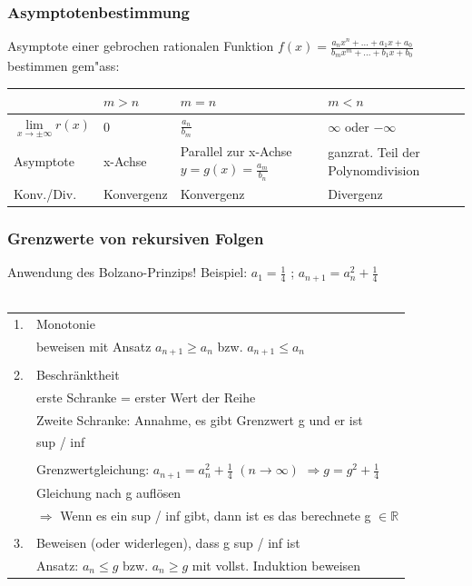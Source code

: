	
		
			\subsubsection{Asymptotenbestimmung}
			Asymptote einer gebrochen rationalen Funktion $f(x) = \frac{a_nx^n + ... + a_1x + a_0}{b_mx^m + ... + b_1x + b_0}$\\
			 bestimmen gem"ass:
			
			\begin{tabular}{|l|l|l|l|}
			\hline
			 & $m > n$ & $m = n$ & $m < n$ \\
			\hline
			 $\lim\limits_{x\to \pm \infty} r(x)$  & 0 & $\frac{a_n}{b_m}$ & $\infty$ oder $-\infty$ \\
			\hline
			 Asymptote & x-Achse & Parallel zur x-Achse $y = g(x) = \frac{a_m}{b_n}$ & ganzrat. Teil der Polynomdivision\\
			\hline
			 Konv./Div. & Konvergenz & Konvergenz & Divergenz \\
			\hline
			\end{tabular}
			
			
			\subsubsection{Grenzwerte von rekursiven Folgen}
			Anwendung des Bolzano-Prinzips!  Beispiel: $a_1 = \frac{1}{4}$ ; $a_{n+1} = a_n^2 + \frac{1}{4}$ \\
			\\
			\begin{tabular}{ll}
			1. & Monotonie \\
			& beweisen mit Ansatz $a_{n+1} \geq a_n$ bzw. $a_{n+1} \leq a_n$ \\
			\\
			2. & Beschränktheit \\
			& erste Schranke = erster Wert der Reihe \\
			& Zweite Schranke: Annahme, es gibt Grenzwert g und er ist \\
			& sup / inf \\
			\\
			 & Grenzwertgleichung: $a_{n+1} = a_n ^2 + \frac{1}{4}$  $(n \rightarrow \infty)$ $\Rightarrow g = g^2 + \frac{1}{4}$ \\
			 & Gleichung nach g auflösen \\
			 & $\Rightarrow$ Wenn es ein sup / inf gibt, dann ist es das berechnete g $\in \mathbb{R}$\\
			 \\
			 3. & Beweisen (oder widerlegen), dass g sup / inf ist \\
			 & Ansatz: $a_n \leq g$ bzw. $a_n \geq g$ mit vollst. Induktion beweisen \\
			\end{tabular}

	\vfill\null
	\pagebreak
